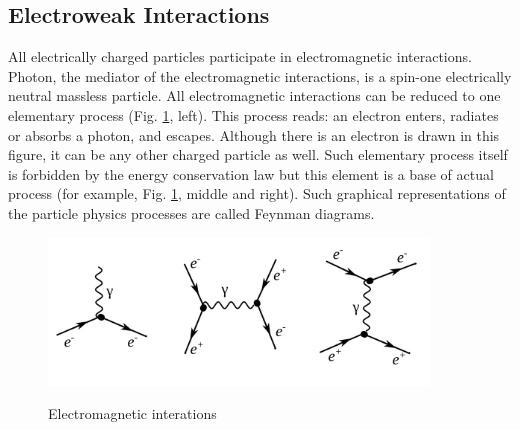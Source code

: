 \subsection{Electroweak Interactions}
\label{sec:Intro_Electroweak}




All electrically charged particles participate in electromagnetic interactions. Photon, the mediator of the electromagnetic interactions, is a spin-one electrically neutral massless particle. All electromagnetic interactions can be reduced to one elementary process (Fig. \ref{fig:feynmEM}, left). This process reads: an electron enters, radiates or absorbs a photon, and escapes. Although there is an electron is drawn in this figure, it can be any other charged particle as well. Such elementary process itself is forbidden by the energy conservation law but this element is a base of actual process (for example, Fig. \ref{fig:feynmEM}, middle and right). Such graphical representations of the particle physics processes are called Feynman diagrams.\\ 

\begin{figure}[htb]
  \begin{center}
    {\includegraphics[width=0.90\textwidth]{../figs/Intro/feynmEM.png}}
    \caption{Electromagnetic interations}
    \label{fig:feynmEM}
  \end{center}
\end{figure}

